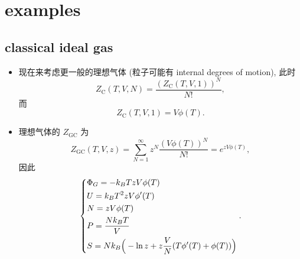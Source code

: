 \section{examples}
\subsection{classical ideal gas}
\begin{itemize}
	\item 现在来考虑更一般的理想气体 (粒子可能有 internal degrees of motion), 此时
	\begin{equation}
		Z_\text{C}(T, V, N) = \frac{(Z_\text{C}(T, V, 1))^N}{N!},
	\end{equation}
	而
	\begin{equation}
		Z_\text{C}(T, V, 1) = V \phi(T).
	\end{equation}
	
	\item 理想气体的 $Z_\text{GC}$ 为
	\begin{equation}
		Z_\text{GC}(T, V, z) = \sum_{N = 1}^\infty z^N \frac{(V \phi(T))^N}{N!} = e^{z V \phi(T)},
	\end{equation}
	因此
	\begin{equation} \label{4.5.4}
		\begin{dcases}
			\Phi_G = - k_B T z V \phi(T) \\
			U = k_B T^2 z V \phi'(T) \\
			N = z V \phi(T) \\
			P = \frac{N k_B T}{V} \\
			S = N k_B \Big( - \ln z + z \frac{V}{N} (T \phi'(T) + \phi(T)) \Big)
		\end{dcases}.
	\end{equation}
\end{itemize}

